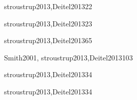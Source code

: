 \begin{syllabus}
\begin{unit}{\PLVirtualMachinesDef}{stroustrup2013,Deitel2013}{2}{2}
   \begin{unitgoals}
      \item \PLVirtualMachinesObjONE
      \item \PLVirtualMachinesObjTWO
      \item \PLVirtualMachinesObjTHREE
   \end{unitgoals}
\end{unit}

\begin{unit}{\PLDeclarationsAndTypesDef}{stroustrup2013,Deitel2013}{2}{3}
   \begin{topics}
      \item \PLDeclarationsAndTypesTopicThe%
      \item \PLDeclarationsAndTypesTopicDeclaration%
      \item \PLDeclarationsAndTypesTopicOverview%
   \end{topics}

   \begin{unitgoals}
	\item \PLDeclarationsAndTypesObjONE
	\item \PLDeclarationsAndTypesObjTWO
	\item \PLDeclarationsAndTypesObjTHREE
	\item \PLDeclarationsAndTypesObjFOUR
	\item \PLDeclarationsAndTypesObjFIVE
   \end{unitgoals}
\end{unit}

\begin{unit}{\PFFundamentalConstructsDef}{stroustrup2013,Deitel2013}{6}{5}
    \PFFundamentalConstructsAllTopics
    \PFFundamentalConstructsAllObjectives
\end{unit}

\begin{unit}{\PLObjectOrientedProgrammingDef}{Smith2001, stroustrup2013,Deitel2013}{10}{3}
   \PLObjectOrientedProgrammingAllTopics
   \PLObjectOrientedProgrammingAllObjectives
\end{unit}

\begin{unit}{\PFAlgorithmsAndProblemSolvingDef}{stroustrup2013,Deitel2013}{3}{4}
    \PFAlgorithmsAndProblemSolvingAllTopics
    \PFAlgorithmsAndProblemSolvingAllObjectives
\end{unit}

\begin{unit}{\PFRecursionDef}{stroustrup2013,Deitel2013}{3}{4}
    \PFRecursionAllTopics
    \PFRecursionAllObjectives
\end{unit}


\end{syllabus}
